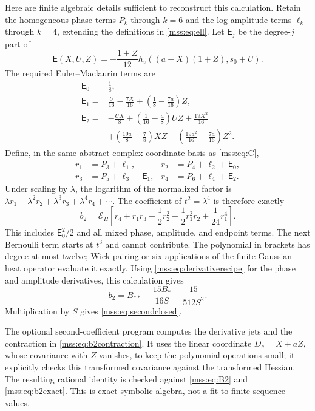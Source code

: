 \documentclass[11pt,letterpaper]{article}
\numberwithin{equation}{section}
\theoremstyle{definition}\newtheorem{definition}[theorem]{Definition}
\theoremstyle{remark}\newtheorem{remark}[theorem]{Remark}
\begin{document}
Here are finite algebraic details sufficient to reconstruct this calculation. Retain the homogeneous phase terms $P_k$ through $k=6$ and the log-amplitude terms $\ell_k$ through $k=4$, extending the definitions in \eqref{mss:eq:ell}. Let $\mathsf E_j$ be the degree-$j$ part of
\[
\mathsf E(X,U,Z)=-\frac{1+Z}{12}h_v((a+X)(1+Z),s_0+U).
\]
The required Euler--Maclaurin terms are
\begin{align}\label{mss:eq:secondEM}
\mathsf E_0={}&\frac18,\\
\mathsf E_1={}&\frac{U}{16}-\frac{7X}{16}
+\left(\frac18-\frac{7a}{16}\right)Z,\nonumber\\
\mathsf E_2={}&-\frac{UX}{8}+\left(\frac1{16}-\frac a8\right)UZ
+\frac{19X^2}{16}\nonumber\\
&+\left(\frac{19a}{8}-\frac78\right)XZ
+\left(\frac{19a^2}{16}-\frac{7a}{16}\right)Z^2.\nonumber
\end{align}
Define, in the same abstract complex-coordinate basis as \eqref{mss:eq:C},
\begin{align}\label{mss:eq:r1234}
r_1&=P_3+\ell_1,&r_2&=P_4+\ell_2+\mathsf E_0,\\
r_3&=P_5+\ell_3+\mathsf E_1,&r_4&=P_6+\ell_4+\mathsf E_2.\nonumber
\end{align}
Under scaling by $\lambda$, the logarithm of the normalized factor is
$\lambda r_1+\lambda^2r_2+\lambda^3r_3+\lambda^4r_4+\cdots$.
The coefficient of $t^2=\lambda^4$ is therefore exactly
\begin{equation}\label{mss:eq:b2contraction}
b_2=\mathcal E_H\left[
 r_4+r_1r_3+\frac12r_2^2
 +\frac12r_1^2r_2+\frac1{24}r_1^4\right].
\end{equation}
This includes $\mathsf E_0^2/2$ and all mixed phase, amplitude, and endpoint terms. The next Bernoulli term starts at $t^3$ and cannot contribute. The polynomial in brackets has degree at most twelve; Wick pairing or six applications of the finite Gaussian heat operator evaluate it exactly. Using \eqref{mss:eq:derivativerecipe} for the phase and amplitude derivatives, this calculation gives
\begin{equation}\label{mss:eq:b2exact}
b_2=B_{**}-\frac{15B_*}{16S}-\frac{15}{512S^2}.
\end{equation}
Multiplication by $S$ gives \eqref{mss:eq:secondclosed}.

The optional second-coefficient program computes the derivative jets and the contraction in \eqref{mss:eq:b2contraction}. It uses the linear coordinate $D_c=X+aZ$, whose covariance with $Z$ vanishes, to keep the polynomial operations small; it explicitly checks this transformed covariance against the transformed Hessian. The resulting rational identity is checked against \eqref{mss:eq:B2} and \eqref{mss:eq:b2exact}. This is exact symbolic algebra, not a fit to finite sequence values.
\end{document}

